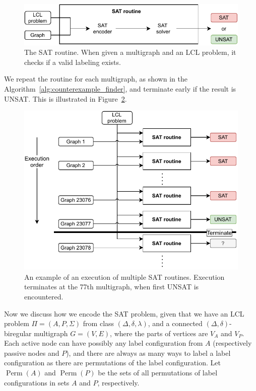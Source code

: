 \begin{figure}[H]
\centering
\includegraphics[]{diagrams/implementation_idea_diagram2.pdf}
\caption{The SAT routine. When given a multigraph and an LCL problem, it checks if a valid labeling exists.}
\label{fig:implementation:1}
\end{figure}

We repeat the routine for each multigraph, as shown in the Algorithm~\ref{alg:counterexample_finder}, and terminate early if the result is UNSAT.
This is illustrated in Figure~\ref{fig:implementation:2}.

\begin{figure}[H]
\centering
\includegraphics[]{diagrams/implementation_idea_diagram3.pdf}
\caption{An example of an execution of multiple SAT routines. Execution terminates at the 77th multigraph, when first UNSAT is encountered.}
\label{fig:implementation:2}
\end{figure}

Now we discuss how we encode the SAT problem, given that we have an LCL problem $\Pi=(A, P, \Sigma)$ from class $(\Delta, \delta, \lambda)$, and a connected $(\Delta, \delta)$-biregular multigraph $G=(V,E)$, where the parts of vertices are $V_A$ and $V_P$.
Each active node can have possibly any label configuration from $A$ (respectively passive nodes and $P$), and there are always as many ways to label a label configuration as there are permutations of the label configuration.
Let $\operatorname{Perm}(A)$ and $\operatorname{Perm}(P)$ be the sets of all permutations of label configurations in sets $A$ and $P$, respectively.

